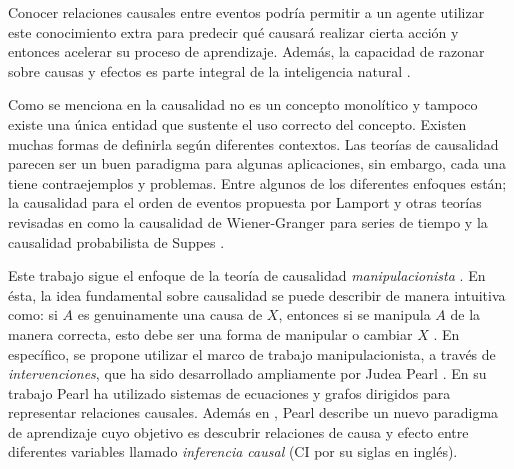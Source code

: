 Conocer relaciones causales entre eventos podría permitir a un agente 
utilizar este conocimiento extra
para predecir qué causará realizar cierta acción
y entonces acelerar su proceso de aprendizaje.
Además, la capacidad de razonar sobre causas y efectos es parte integral de
la inteligencia natural \cite{nair2019causal}.

Como se menciona en \cite{theoryofcausalities2006} 
la causalidad no es un concepto monolítico y tampoco
existe una única entidad que sustente el uso correcto
del concepto. Existen muchas formas de definirla según diferentes contextos. Las teorías de causalidad
parecen ser un buen paradigma para algunas aplicaciones,
sin embargo, cada una tiene contraejemplos y problemas.
Entre algunos de los diferentes enfoques 
están; la causalidad para
el orden de eventos propuesta por Lamport \cite{lamport2019time} y otras teorías revisadas en
\cite{holland1986statistics} como la causalidad de Wiener-Granger para
series de tiempo \cite{granger1969investigating} y la 
causalidad probabilista de Suppes \cite{suppes1973probabilistic}. 





Este trabajo sigue el enfoque de la teoría de causalidad \textit{manipulacionista} \cite{sep-causation-mani}. En ésta, la idea
fundamental sobre causalidad se puede describir de manera intuitiva como: si $A$ es genuinamente una causa de $X$, entonces si se manipula $A$ de la manera correcta, esto debe ser una forma de manipular o cambiar $X$ \cite{campbell1979quasi, woodward2005making}. En específico, 
se propone utilizar el marco de trabajo manipulacionista, a través de \textit{intervenciones}, que
ha sido desarrollado ampliamente por Judea Pearl \cite{pearl_2009}. En su trabajo Pearl ha 
utilizado sistemas de ecuaciones y grafos dirigidos para representar relaciones causales. Además en
\cite{pearl2018bookofwhy}, Pearl describe un nuevo paradigma de aprendizaje cuyo objetivo es descubrir relaciones de causa y efecto entre diferentes variables llamado \textit{inferencia causal} (CI por su siglas en inglés).





